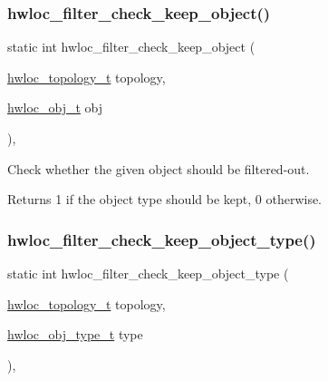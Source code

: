 \subsubsection{\texorpdfstring{hwloc\+\_\+filter\+\_\+check\+\_\+keep\+\_\+object()}{hwloc\_filter\_check\_keep\_object()}}
{\footnotesize\ttfamily static int hwloc\+\_\+filter\+\_\+check\+\_\+keep\+\_\+object (\begin{DoxyParamCaption}\item[{\hyperlink{a00186_ga9d1e76ee15a7dee158b786c30b6a6e38}{hwloc\+\_\+topology\+\_\+t}}]{topology,  }\item[{\hyperlink{a00185_ga79b8ab56877ef99ac59b833203391c7d}{hwloc\+\_\+obj\+\_\+t}}]{obj }\end{DoxyParamCaption})\hspace{0.3cm}{\ttfamily [inline]}, {\ttfamily [static]}}



Check whether the given object should be filtered-\/out. 

\begin{DoxyReturn}{Returns}
1 if the object type should be kept, 0 otherwise. 
\end{DoxyReturn}
\mbox{\label{a00231_ga2f402a43025a8a91e8513be1a15e4635}} 
\subsubsection{\texorpdfstring{hwloc\+\_\+filter\+\_\+check\+\_\+keep\+\_\+object\+\_\+type()}{hwloc\_filter\_check\_keep\_object\_type()}}
{\footnotesize\ttfamily static int hwloc\+\_\+filter\+\_\+check\+\_\+keep\+\_\+object\+\_\+type (\begin{DoxyParamCaption}\item[{\hyperlink{a00186_ga9d1e76ee15a7dee158b786c30b6a6e38}{hwloc\+\_\+topology\+\_\+t}}]{topology,  }\item[{\hyperlink{a00184_gacd37bb612667dc437d66bfb175a8dc55}{hwloc\+\_\+obj\+\_\+type\+\_\+t}}]{type }\end{DoxyParamCaption})\hspace{0.3cm}{\ttfamily [inline]}, {\ttfamily [static]}}



